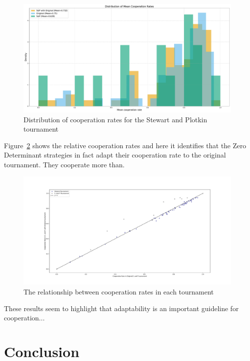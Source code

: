 \documentclass{article}
\begin{document}
\begin{figure}[!hbtp]
    \centering
    \includegraphics[width=.8\textwidth]{assets/sp_tournament_cooperation_rates.pdf}
    \caption{Distribution of cooperation rates for the Stewart and Plotkin
    tournament}
    \label{fig:sp_tournament_cooperation_rates}
\end{figure}

Figure~\ref{fig:sp_relative_cooperation_rates} shows the relative
cooperation rates and here it identifies that the Zero Determinant strategies in
fact adapt their cooperation rate to the original tournament. They cooperate
more than.

\begin{figure}[!hbtp]
    \centering
    \includegraphics[width=.8\textwidth]{assets/sp_relative_cooperation_rates.pdf}
    \caption{The relationship between cooperation rates in each tournament}
    \label{fig:sp_relative_cooperation_rates}
\end{figure}

These results seem to highlight that adaptability is an important guideline for
cooperation...

\section{Conclusion}\label{sec:conclusion}

\end{document}
